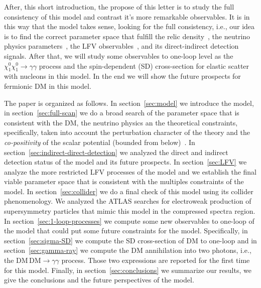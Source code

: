 \documentclass[12pt,letterpaper]{article}
\begin{document}
After, this short introduction, the propose of this letter is to study the full consistency of this model and contrast it's more remarkable observables. It is in this way that the model takes sense, looking for the full consistency, i.e., 
our idea is to find the correct parameter space that fulfill the relic density~\cite{Aghanim:2018eyx}, the neutrino physics parameters~\cite{Forero:2014bxa, deSalas:2017kay}, the LFV observables~\cite{Rocha-Moran:2016enp}, and its direct-indirect detection signals. 
After that, we will study some observables to one-loop level as the $\chi^0_1\chi^0_1\to\gamma\gamma$ process and the spin-dependent (SD) cross-section for elastic scatter with nucleons in this model.  In the end we will show the future prospects for fermionic DM in this model.

The paper is organized as follows. In section~\ref{sec:model} we introduce the model, in section~\ref{sec:full-scan} we do a broad search of the parameter space that is consistent with the DM, the neutrino physics an the theoretical constraints, specifically, taken into account the perturbation character of the theory and the \textit{co-positivity} of the scalar potential (bounded from below)~\cite{Merle:2016scw}. 
In section~\ref{sec:indirect-direct-detection} we analyzed the direct and indirect detection status of the model and its future prospects. 
In section~\ref{sec:LFV} we analyze the more restricted LFV processes of the model and we establish the final viable parameter space that is consistent with the multiples constraints of the model.
In section~\ref{sec:collider} we do a final check of this model using its collider phenomenology. We analyzed the ATLAS searches for electroweak production of supersymmetry particles that mimic this model in the compressed spectra region.
%
In section~\ref{sec:1-loop-processes} we compute some new observables to one-loop of the model that could put some future constraints for the model.
%
Specifically, in section~\ref{sec:sigma-SD} we compute the SD cross-section of DM to one-loop and in section~\ref{sec:gamma-ray} we compute the DM annihilation into two photons, i.e., the $\text{DM}\,\text{DM} \to \gamma\gamma$ process. Those two expressions are reported for the first time for this model.
Finally, in section~\ref{sec:conclusions} we summarize our results, we give the conclusions and the future perspectives of the model.







\end{document}
